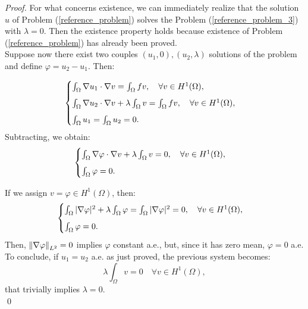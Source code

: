\documentclass[a4paper,11pt]{article}
\begin{document}
\begin{proof}
	For what concerns existence, we can immediately realize that the solution $u$ of Problem (\ref{reference_problem}) solves the Problem (\ref{reference_problem_3}) with $\lambda=0$. Then the existence property holds because existence of Problem (\ref{reference_problem}) has already been proved. \\
	
	\noindent Suppose now there exist two couples $(u_1,0), (u_2,\lambda)$ solutions of the problem and define $\varphi=u_2-u_1$. Then:
	
	\begin{equation*}
	\begin{cases}
	\int_{\Omega}\nabla u_1 \cdot \nabla v = \int_{\Omega} fv, \quad \forall v \in H^1(\Omega),\vspace{2mm} \\
	\int_{\Omega}\nabla u_2 \cdot \nabla v + \lambda \int_\Omega v = \int_{\Omega} fv, \quad \forall v \in H^1(\Omega), \vspace{2mm}\\
	\int_{\Omega}u_1 = \int_{\Omega}u_2 = 0.
	\end{cases}
	\end{equation*}
		Subtracting, we obtain:
	\begin{equation*}
	\begin{cases}
	\int_{\Omega}\nabla \varphi \cdot \nabla v + \lambda \int_\Omega v = 0, \quad \forall v \in H^1(\Omega),\vspace{2mm} \\
	\int_{\Omega}\varphi = 0.
	\end{cases}
	\end{equation*}
	
	\noindent If we assign $v=\varphi \in H^1(\Omega)$, then:
	\begin{equation*}
	\begin{cases}
	\int_{\Omega}|\nabla \varphi|^2 + \lambda \int_\Omega \varphi = \int_{\Omega}|\nabla \varphi|^2 = 0, \quad \forall v \in H^1(\Omega),\vspace{2mm} \\
	\int_{\Omega}\varphi = 0.
	\end{cases}
	\end{equation*}
	Then, $\norm{\nabla \varphi}_{L^2} = 0 $ implies $\varphi$ constant a.e., but, since it has zero mean,  $\varphi = 0$ a.e.  \\
	To conclude, if $u_1=u_2$ a.e. as just proved, the previous system becomes:
	\begin{equation*}
	\lambda \int_{\Omega}v = 0 \quad \forall v \in H^1(\Omega),
	\end{equation*}
	that trivially implies $\lambda=0$.	\\ \qed
\end{proof}
	
\end{document}
